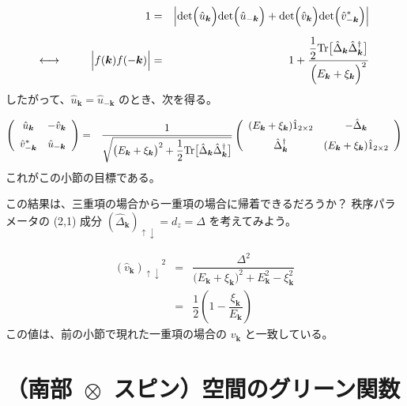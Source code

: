 \documentclass[uplatex,a4j,12pt,dvipdfmx]{jsarticle}
\begin{document}
\begin{eqnarray}
	1
	&=&
	\Big|
	{\rm det} \Big( \hat{u}_{\bm{k}} \Big) {\rm det} \Big( \hat{u}_{- \bm{k}} \Big)
	+
	{\rm det} \Big( \hat{v}_{\bm{k}} \Big) {\rm det} \Big( \hat{v}_{- \bm{k}}^{*} \Big)
	\Big|
	\nonumber \\[2mm] \longleftrightarrow \hspace{9mm}
	\Big| f(\bm{k})f(-\bm{k}) \Big|
	&=&
	1
	+
	\dfrac{
		\dfrac{1}{2} {\rm Tr} \big[ \hat{\Delta}_{\bm{k}} \hat{\Delta}^{\dagger}_{\bm{k}} \big]
	}
	{
		\Big( E_{\bm{k}} + \xi_{\bm{k}} \Big)^{2}
	}
\end{eqnarray}
%
したがって、$\hat{u}_{\bm{k}} = \hat{u}_{ - \bm{k} }$ のとき、次を得る。

\begin{eqnarray}
	\left(
	\begin{array}{cc}
			\hat{u}_{\bm{k}}       & - \hat{v}_{\bm{k}} \\[2mm]
			\hat{v}_{- \bm{k}}^{*} & \hat{u}_{-\bm{k}}
		\end{array}
	\right)
	&=&
	\dfrac{ 1 }{ \sqrt{ \big( E_{\bm{k}} + \xi_{\bm{k}} \big)^{2} + \dfrac{1}{2} {\rm Tr} \big[ \hat{\Delta}_{\bm{k}} \hat{\Delta}^{\dagger}_{\bm{k}} \big] } }
	\left(
	\begin{array}{cc}
			( E_{\bm{k}} + \xi_{\bm{k}} ) \hat{1}_{2 \times 2} & - \hat{\Delta}_{\bm{k}}                             \\[2mm]
			\hat{\Delta}_{\bm{k}}^{\dagger}                     & ( E_{\bm{k}} + \xi_{\bm{k}} ) \hat{1}_{2 \times 2}
		\end{array}
	\right)
\end{eqnarray}
%
これがこの小節の目標である。

この結果は、三重項の場合から一重項の場合に帰着できるだろうか？
秩序パラメータの (2,1) 成分 $(\hat{\Delta}_{\bm{k}})_{\uparrow \downarrow} = d_{z} = \Delta$ を考えてみよう。

\begin{eqnarray}
	{(\hat{v}_{\bm{k}})_{\uparrow \downarrow}}^{2}
	&=&
	\dfrac{ \Delta^{2} }{ \big( E_{\bm{k}} + \xi_{\bm{k}} \big)^{2} + E_{\bm{k}}^{2} - \xi_{\bm{k}}^{2} }
	\nonumber \\[2mm] &=&
	\dfrac{1}{2}
	\left( 1 - \dfrac{\xi_{\bm{k}}}{E_{\bm{k}}} \right)
\end{eqnarray}
%
この値は、前の小節で現れた一重項の場合の $v_{\bm{k}}$ と一致している。

\section{（南部 $\!\! \otimes \!\!$ スピン）空間のグリーン関数}
\end{document}
